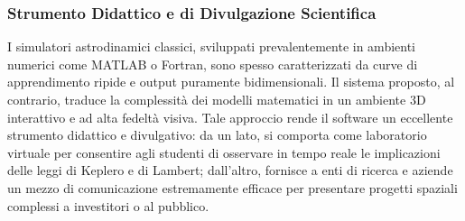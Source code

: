 \subsubsection{Strumento Didattico e di Divulgazione Scientifica}
I simulatori astrodinamici classici, sviluppati prevalentemente in ambienti numerici come MATLAB o Fortran, sono spesso caratterizzati da curve di apprendimento ripide e output puramente bidimensionali. Il sistema proposto, al contrario, traduce la complessità dei modelli matematici in un ambiente 3D interattivo e ad alta fedeltà visiva. Tale approccio rende il software un eccellente strumento didattico e divulgativo: da un lato, si comporta come laboratorio virtuale per consentire agli studenti di osservare in tempo reale le implicazioni delle leggi di Keplero e di Lambert; dall'altro, fornisce a enti di ricerca e aziende un mezzo di comunicazione estremamente efficace per presentare progetti spaziali complessi a investitori o al pubblico.

